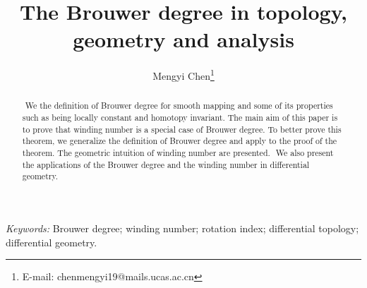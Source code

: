 \documentclass[11pt]{article}
\numberwithin{equation}{section} \numberwithin{theorem}{section}
\numberwithin{lemma}{section} \numberwithin{remark}{section}
\numberwithin{table}{section} \numberwithin{corollary}{section}
\numberwithin{example}{section} \numberwithin{conjecture}{section}
\numberwithin{assumption}{section}
\numberwithin{definition}{section}
\numberwithin{proposition}{section}
\begin{document}
\title{The Brouwer degree in topology, geometry and analysis}

\author[1]{Mengyi Chen\thanks{E-mail: chenmengyi19@mails.ucas.ac.cn}}

\maketitle
\begin{abstract}

​    We the definition of Brouwer degree for smooth mapping and some of its properties such as being locally constant and homotopy invariant. The main aim of this paper is to prove that winding number is a special case of Brouwer degree. To better prove this theorem, we generalize the definition of Brouwer degree and apply to the proof of the theorem. The geometric intuition of winding number are presented. 
​    We also present the applications of the Brouwer degree and the winding number in differential geometry.
\end{abstract}

\emph{Keywords:}
Brouwer degree; winding number; rotation index; differential topology; differential geometry.
\end{document}
